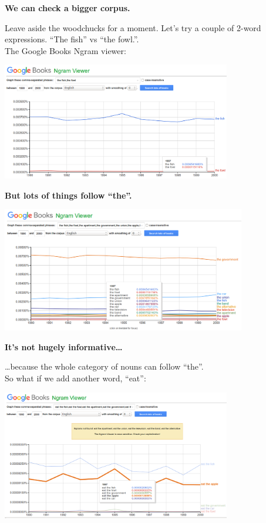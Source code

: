 \documentclass{beamer}
\newcommand{\pagestepalt}[2]{
  \begin{frame}[t]
    \begin{minipage}[t][0.26\textheight][t]{\textwidth}
      \begin{center}
        \huge
        \textbf{#1}
      \end{center}
    \end{minipage}
    
    \begin{minipage}[t][0.7\textheight][t]{\textwidth}
      #2
    \end{minipage}
  \end{frame}
}
\begin{document}
\pagestepalt{We can check a bigger corpus.}{
  Leave aside the woodchucks for a moment. Let's try a couple of 2-word
  expressions. ``The fish'' vs ``the fowl.''.\\
  The Google Books Ngram viewer:
  \begin{center}
    \includegraphics[width=0.75\textwidth]{images/fishvfowl.png}
  \end{center}
}

\pagestepalt{But lots of things follow ``the''.}{
  \begin{center}
    \includegraphics[width=0.8\textwidth]{images/fishvlots.png}
  \end{center}
}

\pagestepalt{It's not hugely informative\ldots}{
  \ldots because the whole category of nouns can follow ``the''.\\ \pause
  So what if we add another word, ``eat'':
  \begin{center}
    \includegraphics[width=0.75\textwidth]{images/eat.png}
  \end{center}
}
\end{document}
